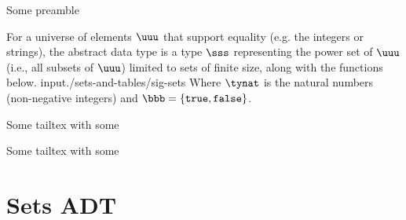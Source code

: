 Some preamble \somecommand
\begin{cluster}
\begin{datatype}[Sets]
\label{XXadt:sets} 
For a universe of elements $\uuu$ that support equality (e.g. the integers or strings), the 
 abstract data type is a type $\sss$ representing the power 
set of $\uuu$ (i.e., all subsets of $\uuu$) limited to sets of finite 
size, along with the functions below. 
{\normalsize
input{./sets-and-tables/sig-sets}
}
Where $\tynat$ is 
the natural numbers (non-negative integers) and $\bbb = \{\texttt{true},
\texttt{false}\}$.
\end{datatype}
Some tailtex with some \command
\end{cluster}

Some tailtex with some \command

\section{Sets ADT}

